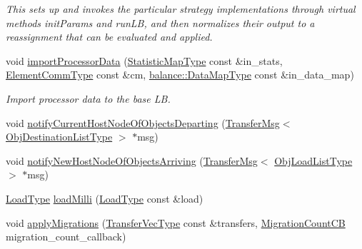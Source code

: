 \begin{DoxyCompactItemize}
\begin{DoxyCompactList}\small\item\em This sets up and invokes the particular strategy implementations through virtual methods {\ttfamily init\+Params} and {\ttfamily run\+LB}, and then normalizes their output to a reassignment that can be evaluated and applied. \end{DoxyCompactList}\item 
void \hyperlink{structvt_1_1vrt_1_1collection_1_1lb_1_1_base_l_b_acdf39bf5a6d72d1f9e36c9a0508992fc}{import\+Processor\+Data} (\hyperlink{structvt_1_1vrt_1_1collection_1_1lb_1_1_base_l_b_acd9bdad961ac83c96b7a227de672f96c}{Statistic\+Map\+Type} const \&in\+\_\+stats, \hyperlink{structvt_1_1vrt_1_1collection_1_1lb_1_1_base_l_b_a83eb4daec14edfb8780422e95b8e38d3}{Element\+Comm\+Type} const \&cm, \hyperlink{namespacevt_1_1vrt_1_1collection_1_1balance_acf152c668ed9e2e9c6b29784181d2435}{balance\+::\+Data\+Map\+Type} const \&in\+\_\+data\+\_\+map)
\begin{DoxyCompactList}\small\item\em Import processor data to the base LB. \end{DoxyCompactList}\item 
void \hyperlink{structvt_1_1vrt_1_1collection_1_1lb_1_1_base_l_b_a0f3cd0272069ff5fb31d6539c567efeb}{notify\+Current\+Host\+Node\+Of\+Objects\+Departing} (\hyperlink{structvt_1_1vrt_1_1collection_1_1lb_1_1_transfer_msg}{Transfer\+Msg}$<$ \hyperlink{structvt_1_1vrt_1_1collection_1_1lb_1_1_base_l_b_ad50ba1022c6beeb6e9187a8f1a3e16fe}{Obj\+Destination\+List\+Type} $>$ $\ast$msg)
\item 
void \hyperlink{structvt_1_1vrt_1_1collection_1_1lb_1_1_base_l_b_a2bab9ccb4d2378b3915b03c79d5b18c2}{notify\+New\+Host\+Node\+Of\+Objects\+Arriving} (\hyperlink{structvt_1_1vrt_1_1collection_1_1lb_1_1_transfer_msg}{Transfer\+Msg}$<$ \hyperlink{structvt_1_1vrt_1_1collection_1_1lb_1_1_base_l_b_ae16d5f0fe9078684bc8e4a4b86ce3a0c}{Obj\+Load\+List\+Type} $>$ $\ast$msg)
\item 
\hyperlink{namespacevt_a8fb51741340b87d7aaee0bef60e9896b}{Load\+Type} \hyperlink{structvt_1_1vrt_1_1collection_1_1lb_1_1_base_l_b_a82c6f98e4294a85e7599964c01fdb1b9}{load\+Milli} (\hyperlink{namespacevt_a8fb51741340b87d7aaee0bef60e9896b}{Load\+Type} const \&load)
\item 
void \hyperlink{structvt_1_1vrt_1_1collection_1_1lb_1_1_base_l_b_aa19210106d6f44ea03b446c7f6a92cb1}{apply\+Migrations} (\hyperlink{structvt_1_1vrt_1_1collection_1_1lb_1_1_base_l_b_a329e8179ec41a1bd4924c79fe23a79af}{Transfer\+Vec\+Type} const \&transfers, \hyperlink{structvt_1_1vrt_1_1collection_1_1lb_1_1_base_l_b_aba7198eb30aef1b19c1f1efdea760543}{Migration\+Count\+CB} migration\+\_\+count\+\_\+callback)

\end{DoxyCompactItemize}
